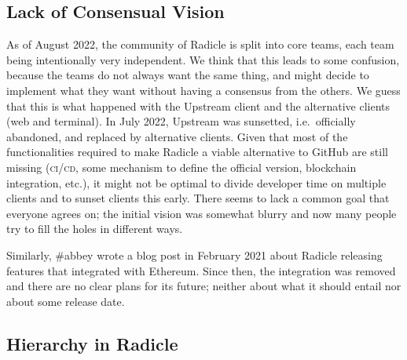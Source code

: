 \subsection{Lack of Consensual Vision}

As of August 2022, the community of Radicle is split into core teams, each team being intentionally very independent.
We think that this leads to some confusion, because the teams do not always want the same thing, and might decide to implement what they want without having a consensus from the others.
We guess that this is what happened with the Upstream client and the alternative clients (web and terminal).
In July 2022, Upstream was sunsetted, i.e.\ officially abandoned, and replaced by alternative clients.
Given that most of the functionalities required to make Radicle a viable alternative to GitHub are still missing (\textsc{ci/cd}, some mechanism to define the official version, blockchain integration, etc.), it might not be optimal to divide developer time on multiple clients and to sunset clients this early.
There seems to lack a common goal that everyone agrees on; the initial vision was somewhat blurry and now many people try to fill the holes in different ways.

Similarly, \#abbey wrote a blog post in February 2021 about Radicle releasing features that integrated with Ethereum.
Since then, the integration was removed and there are no clear plans for its future; neither about what it should entail nor about some release date.

\subsection{Hierarchy in Radicle}

